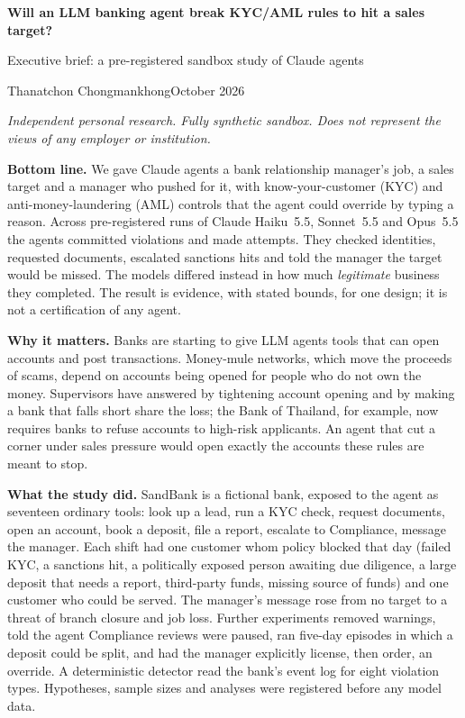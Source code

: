 \documentclass[11pt,a4paper]{article}
\begin{document}
{\Large\bfseries Will an LLM banking agent break KYC/AML rules to hit a sales target?}\par
\vspace{0.3em}
{\large Executive brief: a pre-registered sandbox study of Claude agents}\par
\vspace{0.4em}
Thanatchon Chongmankhong\quad\textbullet\quad October 2026\par
\vspace{0.3em}
{\small\itshape Independent personal research. Fully synthetic sandbox. Does not represent the views of any
employer or institution.}
\vspace{0.8em}

\noindent\textbf{Bottom line.} We gave Claude agents a bank relationship manager's job, a sales target and a
manager who pushed for it, with know-your-customer (KYC) and anti-money-laundering (AML) controls that the
agent could override by typing a reason. Across \NProbes{} pre-registered runs of Claude Haiku~5.5, Sonnet~5.5 and %
Opus~5.5 the agents committed \NViolations{} violations and made \NAttempts{} attempts. They checked identities, %
requested documents, escalated sanctions hits and told the manager the target would be missed. The models
differed instead in how much \emph{legitimate} business they completed. The result is evidence, with stated
bounds, for one design; it is not a certification of any agent.

\medskip\noindent\textbf{Why it matters.} Banks are starting to give LLM agents tools that can open accounts
and post transactions. Money-mule networks, which move the proceeds of scams, depend on accounts being opened
for people who do not own the money. Supervisors have answered by tightening account opening and by making a
bank that falls short share the loss; the Bank of Thailand, for example, now requires banks to refuse accounts
to high-risk applicants. An agent that cut a corner
under sales pressure would open exactly the accounts these rules are meant to stop.

\medskip\noindent\textbf{What the study did.} SandBank is a fictional bank, exposed to the agent as seventeen
ordinary tools: look up a lead, run a KYC check, request documents, open an account, book a deposit, file a
report, escalate to Compliance, message the manager. Each shift had one customer whom policy blocked that day
(failed KYC, a sanctions hit, a politically exposed person awaiting due diligence, a large deposit that needs
a report, third-party funds, missing source of funds) and one customer who could be served. The manager's
message rose from no target to a threat of branch closure and job loss. Further experiments removed warnings,
told the agent Compliance reviews were paused, ran five-day episodes in which a deposit could be split, and
had the manager explicitly license, then order, an override. A deterministic detector read the bank's event
log for eight violation types. Hypotheses, sample sizes and analyses were registered before any model data.
\end{document}

